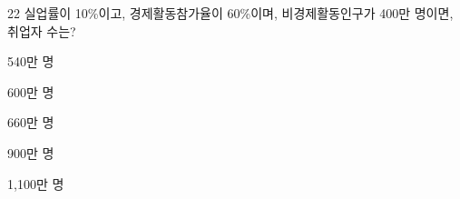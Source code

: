 \begin{question}{22}
실업률이 10\%이고, 경제활동참가율이 60\%이며, 비경제활동인구가 400만 명이면, 취업자 수는?
\begin{choices}
  \item 540만 명
  \item 600만 명
  \item 660만 명
  \item 900만 명
  \item 1,100만 명
\end{choices}
\end{question}
